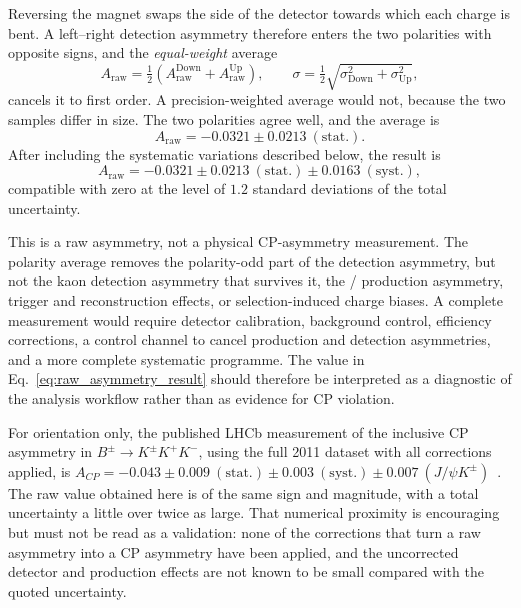 Reversing the magnet swaps the side of the detector towards which each charge is
bent. A left--right detection asymmetry therefore enters the two polarities with
opposite signs, and the \emph{equal-weight} average
\begin{equation}
  A_{\mathrm{raw}} = \tfrac{1}{2}\left(A_{\mathrm{raw}}^{\mathrm{Down}} + A_{\mathrm{raw}}^{\mathrm{Up}}\right),
  \qquad
  \sigma = \tfrac{1}{2}\sqrt{\sigma_{\mathrm{Down}}^2 + \sigma_{\mathrm{Up}}^2},
\end{equation}
cancels it to first order. A precision-weighted average would not, because the
two samples differ in size. The two polarities agree well, and the average is
\begin{equation}
  A_{\mathrm{raw}} = -0.0321 \pm 0.0213~\mathrm{(stat.)}.
\end{equation}
After including the systematic variations described below, the result is
\begin{equation}
  A_{\mathrm{raw}} =
  -0.0321 \pm 0.0213~\mathrm{(stat.)}
  \pm 0.0163~\mathrm{(syst.)},
  \label{eq:raw_asymmetry_result}
\end{equation}
compatible with zero at the level of $1.2$ standard deviations of the total
uncertainty.

This is a raw asymmetry, not a physical CP-asymmetry measurement. The polarity
average removes the polarity-odd part of the detection asymmetry, but not the
kaon detection asymmetry that survives it, the \Bplus{}/\Bminus{} production
asymmetry, trigger and reconstruction effects, or selection-induced charge
biases. A complete measurement would require detector calibration, background
control, efficiency corrections, a control channel to cancel production and
detection asymmetries, and a more complete systematic programme. The value in
Eq.~\ref{eq:raw_asymmetry_result} should therefore be interpreted as a diagnostic
of the analysis workflow rather than as evidence for CP violation.

For orientation only, the published LHCb measurement of the inclusive CP
asymmetry in $B^\pm \to K^\pm K^+ K^-$, using the full 2011 dataset with all
corrections applied, is $A_{CP} = -0.043 \pm 0.009~\mathrm{(stat.)} \pm
0.003~\mathrm{(syst.)} \pm 0.007~(J/\psi K^\pm)$~\cite{lhcb3body}. The raw value
obtained here is of the same sign and magnitude, with a total uncertainty a little
over twice as large. That numerical proximity is encouraging but must not be read
as a validation: none of the corrections that turn a raw asymmetry into a CP
asymmetry have been applied, and the uncorrected detector and production effects
are not known to be small compared with the quoted uncertainty.

